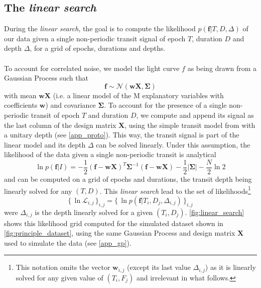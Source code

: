 \documentclass{aastex631}
\newcommand{\set}[1]{\{\,#1\,\}}
\begin{document}
\subsection{The \textit{linear search}}\label{linear_search}

During the \textit{linear search}, the goal is to compute the likelihood $p(\bm{f} \vert T , D, \Delta)$ of our data given a single non-periodic transit signal of epoch $T$, duration $D$ and depth $\Delta$, for a grid of epochs, durations and depths.
\\\\
To account for correlated noise, we model the light curve $f$ as being drawn from a Gaussian Process such that
$$\bm{f} \sim \mathcal{N}(\bm{w X}, \bm{\Sigma})$$
with mean $\bm{wX}$ (i.e. a linear model of the M explanatory variables with coefficients $\bm{w}$) and covariance $\bm{\Sigma}$. To account for the presence of a single non-periodic transit of epoch $T$ and duration $D$, we compute and append its signal as the last column of the design matrix $\bm{X}$, using the simple transit model from \citealt{protopapas} with a unitary depth (see \autoref{app_proto}). This way, the transit signal is part of the linear model and its depth $\Delta$ can be solved linearly. Under this assumption, the likelihood of the data given a single non-periodic transit is analytical
\begin{equation} \label{eq:linear_search_ll}
    \ln p(\bm{f} \vert I) = -\frac{1}{2}(\bm{f}-\bm{wX})^T\bm{\Sigma}^{-1}(\bm{f}-\bm{wX}) -  \frac{1}{2}\vert\bm{\Sigma}\vert - \frac{N}{2}\ln 2
\end{equation}
and can be computed on a grid of epochs and durations, the transit depth being linearly solved for any $(T, D)$. This \textit{linear search} lead to the set of likelihoods\footnote{This notation omits the vector $\bm{w}_{i,j}$ (except its last value $\Delta_{i,j}$) as it is linearly solved for any given value of $(T_i, F_j)$ and irrelevant in what follows.}
$$\set{\ln\mathcal{L}_{i,j}}_{i, j} = \set{\ln p(\bm{f} \vert T_i ,D_j, \Delta_{i,j})}_{i, j}$$
were $\Delta_{i,j}$ is the depth linearly solved for a given $(T_i, D_j)$. \autoref{fig:linear_search} shows this likelihood grid computed for the simulated dataset shown in \autoref{fig:principle_dataset}, using the same Gaussian Process and design matrix $\bm{X}$ used to simulate the data (see \autoref{app_gp}).
\end{document}
